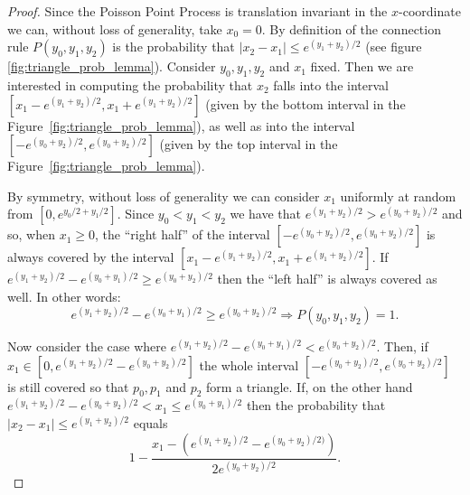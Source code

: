\begin{proof}
Since the Poisson Point Process is translation invariant in the $x$-coordinate we can, without loss of generality, take $x_0 = 0$.  By definition of the connection rule $P(y_0,y_1,y_2)$ is the probability that $|x_2-x_1| \leq  e^{(y_1+y_2)/2}$ (see figure \ref{fig:triangle_prob_lemma}). Consider $y_0, y_1, y_2$ and $x_1$ fixed. Then we are interested in computing the probability that $x_2$ falls into the interval $[x_1-e^{(y_1+y_2)/2},x_1+e^{(y_1+y_2)/2}]$ (given by the bottom interval in the Figure~\ref{fig:triangle_prob_lemma}), as well as into the interval $[-e^{(y_0+y_2)/2},e^{(y_0+y_2)/2}]$ (given by the top interval in the Figure~\ref{fig:triangle_prob_lemma}).

%

By symmetry, without loss of generality we can consider $x_1$ uniformly at random from $[0,e^{y_0/2+y_1/2}]$. 
Since $y_0 < y_1 < y_2$ we have that $e^{(y_1+y_2)/2} > e^{(y_0+y_2)/2}$ and so, when $x_1 \geq 0$, the ``right half'' of the interval $[-e^{(y_0+y_2)/2}, e^{(y_0+y_2)/2}]$ is always covered by the interval $[x_1-e^{(y_1+y_2)/2}, x_1+e^{(y_1+y_2)/2}]$.
If $e^{(y_1+y_2)/2} - e^{(y_0+y_1)/2} \geq e^{(y_0+y_2)/2}$ then the ``left half'' is always covered as well.
In other words:
\[
	e^{(y_1+y_2)/2} - e^{(y_0+y_1)/2} \geq e^{(y_0+y_2)/2} \Rightarrow P(y_0,y_1,y_2) = 1.
\]

Now consider the case where $e^{(y_1+y_2)/2} - e^{(y_0+y_1)/2} < e^{(y_0+y_2)/2}$. Then, if $x_1 \in [0, e^{(y_1+y_2)/2} - e^{(y_0+y_2)/2}]$ the whole interval $[-e^{(y_0+y_2)/2}, e^{(y_0+y_2)/2}]$ is still covered so that $p_0, p_1$ and $p_2$ form a triangle. If, on the other hand $e^{(y_1+y_2)/2} - e^{(y_0+y_2)/2} < x_1 \leq e^{(y_0+y_1)/2}$ then
the probability that $|x_2-x_1| \leq e^{(y_1+y_2)/2}$ equals
\[ 
	1 - \frac{x_1 - (e^{(y_1+y_2)/2} - e^{(y_0+y_2)/2)}) }{ 2e^{(y_0+y_2)/2} }. 
\]


\end{proof}
